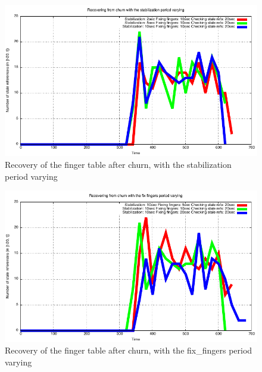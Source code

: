 \documentclass[a4paper, 11pt]{article}
\theoremstyle{plain}
\theoremstyle{definition}
\begin{document}
    \begin{figure}[h]
      \centering
      \includegraphics{plots/Recovery-SR-stabilization.pdf}
      \caption{Recovery of the finger table after churn, with the stabilization period varying}
      \label{fig:Rec-SR-stab}
    \end{figure}
    
    
    \begin{figure}[h]
      \centering
      \includegraphics{plots/Recovery-SR-fix-fingers.pdf}
      \caption{Recovery of the finger table after churn, with the fix\_fingers period varying}
      \label{fig:Rec-SR-fix-fingers}
    \end{figure}
    
\end{document}
